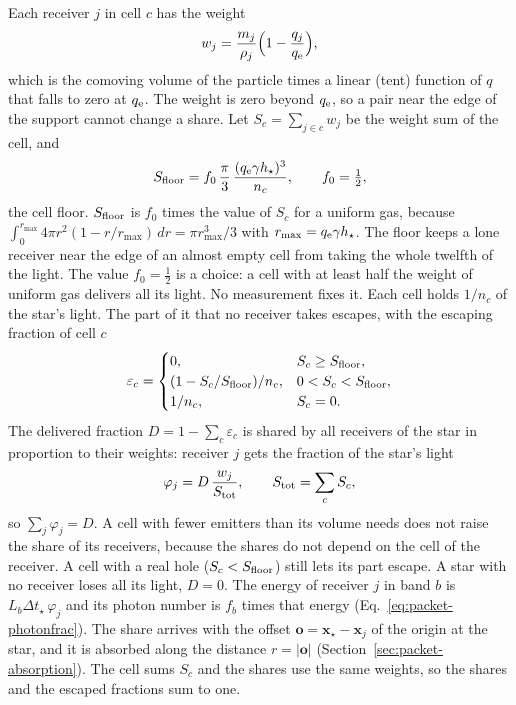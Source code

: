 Each receiver $j$ in cell $c$ has the weight
\begin{equation}
  w_j = \frac{m_j}{\rho_j}\Big(1-\frac{q_j}{q_{\rm e}}\Big),
  \label{eq:packet-tent}
\end{equation}
which is the comoving volume of the particle times a linear (tent) function of
$q$ that falls to zero at $q_{\rm e}$. The weight is zero beyond $q_{\rm e}$, so
a pair near the edge of the support cannot change a share. Let
$S_c=\sum_{j\in c}w_j$ be the weight sum of the cell, and
\begin{equation}
  S_{\rm floor} = f_0\,\frac{\pi}{3}\,\frac{(q_{\rm e}\gamma h_\star)^3}{n_c},
  \qquad f_0=\tfrac12,
  \label{eq:packet-floor}
\end{equation}
the cell floor. $S_{\rm floor}$ is $f_0$ times the value of $S_c$ for a uniform
gas, because $\int_0^{r_{\max}}4\pi r^2(1-r/r_{\max})\,dr=\pi r_{\max}^3/3$ with
$r_{\max}=q_{\rm e}\gamma h_\star$. The floor keeps a lone receiver near the
edge of an almost empty cell from taking the whole twelfth of the light. The
value $f_0=\tfrac12$ is a choice: a cell with at least half the weight of
uniform gas delivers all its light. No measurement fixes it. Each cell holds $1/n_c$ of the star's
light. The part of it that no receiver takes escapes, with the escaping
fraction of cell $c$
\begin{equation}
  \varepsilon_c =
  \begin{cases}
    0, & S_c\ge S_{\rm floor},\\
    (1-S_c/S_{\rm floor})/n_c, & 0<S_c<S_{\rm floor},\\
    1/n_c, & S_c=0.
  \end{cases}
  \label{eq:packet-escape}
\end{equation}
The delivered fraction $D=1-\sum_c\varepsilon_c$ is shared by all receivers of
the star in proportion to their weights: receiver $j$ gets the fraction of the
star's light
\begin{equation}
  \varphi_j = D\,\frac{w_j}{S_{\rm tot}}, \qquad S_{\rm tot}=\sum_c S_c,
  \label{eq:packet-emit-share}
\end{equation}
so $\sum_j\varphi_j=D$. A cell with fewer emitters than its volume needs does
not raise the share of its receivers, because the shares do not depend on the
cell of the receiver. A cell with a real hole ($S_c<S_{\rm floor}$) still lets
its part escape. A star with no receiver loses all its light, $D=0$. The energy
of receiver $j$ in band $b$ is $L_b\Delta t_\star\,\varphi_j$ and its photon
number is $f_b$ times that energy (Eq.~\eqref{eq:packet-photonfrac}). The share
arrives with the offset $\boldsymbol{o}=\boldsymbol{x}_\star-\boldsymbol{x}_j$
of the origin at the star, and it is absorbed along the distance
$r=|\boldsymbol{o}|$ (Section~\ref{sec:packet-absorption}). The cell sums
$S_c$ and the shares use the same weights, so the shares and the escaped
fractions sum to one.

